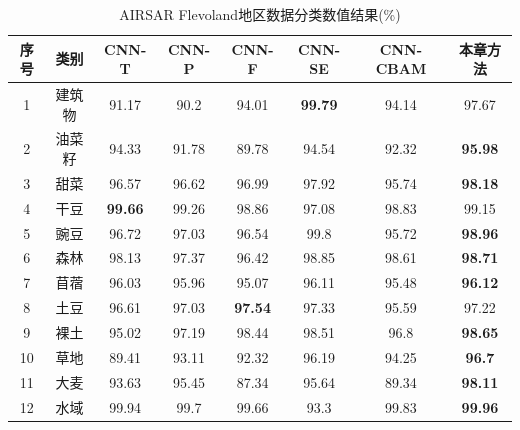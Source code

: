 \begin{table}[ht!]
    \label{tab:fle_res}
    \caption{AIRSAR Flevoland地区数据分类数值结果(\%)}
    \renewcommand\arraystretch{1.0}
    \begin{tabular}{cccccccc}
        \toprule[1.5bp]
        序号                        & 类别    & CNN-T          & CNN-P          & CNN-F          & CNN-SE         & CNN-CBAM       & 本章方法           \\
        \midrule[0.75bp]
        1                         & 建筑物   & 91.17          & 90.2           & 94.01          & \textbf{99.79} & 94.14          & 97.67          \\
        2                         & 油菜籽   & 94.33          & 91.78          & 89.78          & 94.54          & 92.32          & \textbf{95.98} \\
        3                         & 甜菜    & 96.57          & 96.62          & 96.99          & 97.92          & 95.74          & \textbf{98.18} \\
        4                         & 干豆    & \textbf{99.66} & 99.26          & 98.86          & 97.08          & 98.83          & 99.15          \\
        5                         & 豌豆    & 96.72          & 97.03          & 96.54          & 99.8           & 95.72          & \textbf{98.96} \\
        6                         & 森林    & 98.13          & 97.37          & 96.42          & 98.85          & 98.61          & \textbf{98.71} \\
        7                         & 苜蓿    & 96.03          & 95.96          & 95.07          & 96.11          & 95.48          & \textbf{96.12} \\
        8                         & 土豆    & 96.61          & 97.03          & \textbf{97.54} & 97.33          & 95.59          & 97.22          \\
        9                         & 裸土    & 95.02          & 97.19          & 98.44          & 98.51          & 96.8           & \textbf{98.65} \\
        10                        & 草地    & 89.41          & 93.11          & 92.32          & 96.19          & 94.25          & \textbf{96.7}  \\
        11                        & 大麦    & 93.63          & 95.45          & 87.34          & 95.64          & 89.34          & \textbf{98.11} \\
        12                        & 水域    & 99.94          & 99.7           & 99.66          & 93.3           & 99.83          & \textbf{99.96} \\

\end{tabular}
\end{table}
